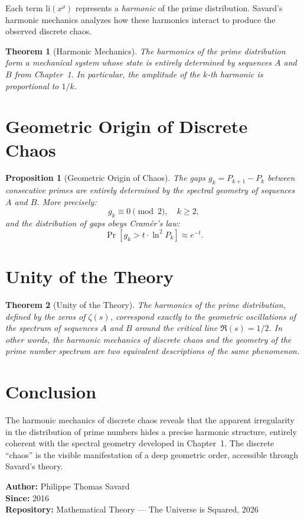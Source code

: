 \documentclass[12pt,a4paper]{article}
\newtheorem{theorem}{Theorem}
\newtheorem{proposition}{Proposition}
\begin{document}
Each term $\mathrm{li}(x^\rho)$ represents a \emph{harmonic} of the prime distribution.
Savard's harmonic mechanics analyzes how these harmonics interact to produce the
observed discrete chaos.

\begin{theorem}[Harmonic Mechanics]
The harmonics of the prime distribution form a mechanical system whose state is
entirely determined by sequences $A$ and $B$ from Chapter~1. In particular, the
amplitude of the $k$-th harmonic is proportional to $1/k$.
\end{theorem}

\section{Geometric Origin of Discrete Chaos}

\begin{proposition}[Geometric Origin of Chaos]
The gaps $g_k = P_{k+1} - P_k$ between consecutive primes are entirely determined
by the spectral geometry of sequences $A$ and $B$. More precisely:
\[
  g_k \equiv 0 \pmod{2}, \quad k \geq 2,
\]
and the distribution of gaps obeys Cramér's law:
\[
  \Pr[g_k > t \cdot \ln^2 P_k] \approx e^{-t}.
\]
\end{proposition}

\section{Unity of the Theory}

\begin{theorem}[Unity of the Theory]
The harmonics of the prime distribution, defined by the zeros of $\zeta(s)$, correspond
exactly to the geometric oscillations of the spectrum of sequences $A$ and $B$ around
the critical line $\Re(s) = 1/2$.
In other words, the harmonic mechanics of discrete chaos and the geometry of the prime
number spectrum are two equivalent descriptions of the same phenomenon.
\end{theorem}

\section{Conclusion}

The harmonic mechanics of discrete chaos reveals that the apparent irregularity in
the distribution of prime numbers hides a precise harmonic structure, entirely coherent
with the spectral geometry developed in Chapter~1. The discrete ``chaos'' is the visible
manifestation of a deep geometric order, accessible through Savard's theory.

\bigskip
\noindent\textbf{Author:} Philippe Thomas Savard\\
\noindent\textbf{Since:} 2016\\
\noindent\textbf{Repository:} Mathematical Theory — The Universe is Squared, 2026
\end{document}
